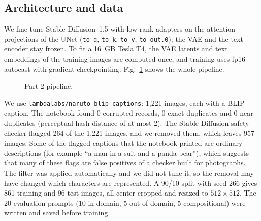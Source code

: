 \subsection{Architecture and data}
We fine-tune Stable Diffusion~1.5 \cite{rombach} with low-rank adapters \cite{hu} on the attention projections of the UNet (\texttt{to\_q}, \texttt{to\_k}, \texttt{to\_v}, \texttt{to\_out.0}); the VAE and the text encoder stay frozen. To fit a 16~GB Tesla T4, the VAE latents and text embeddings of the training images are computed once, and training uses fp16 autocast with gradient checkpointing. Fig.~\ref{fig:p2arch} shows the whole pipeline.
\begin{figure}[!t]
\centering
{}
\caption{Part 2 pipeline.}
\label{fig:p2arch}
\end{figure}

We use \texttt{lambdalabs/naruto-blip-captions}: 1{,}221 images, each with a BLIP caption. The notebook found 0 corrupted records, 0 exact duplicates and 0 near-duplicates (perceptual-hash distance of at most 2). The Stable Diffusion safety checker flagged 264 of the 1{,}221 images, and we removed them, which leaves 957 images. Some of the flagged captions that the notebook printed are ordinary descriptions (for example ``a man in a suit and a panda bear''), which suggests that many of these flags are false positives of a checker built for photographs. The filter was applied automatically and we did not tune it, so the removal may have changed which characters are represented. A 90/10 split with seed 266 gives 861 training and 96 test images, all center-cropped and resized to $512\times512$. The 20 evaluation prompts (10 in-domain, 5 out-of-domain, 5 compositional) were written and saved before training.

